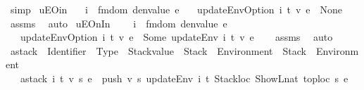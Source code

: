 \begin{isabellebody}
\ simp\isanewline
{}\isamarkupfalse%
%
\endisatagproof
{\isafoldproof}%
%
\isadelimproof
\isanewline
%
\endisadelimproof
\isanewline
{}\isamarkupfalse%
\ uEO{\isacharunderscore}{\kern0pt}in{\isacharcolon}{\kern0pt}\isanewline
\ \ \ {\isachardoublequoteopen}i\ {\isacharbar}{\kern0pt}{\isasymin}{\isacharbar}{\kern0pt}\ fmdom\ {\isacharparenleft}{\kern0pt}denvalue\ e{\isacharparenright}{\kern0pt}{\isachardoublequoteclose}\isanewline
\ \ \ {\isachardoublequoteopen}updateEnvOption\ i\ t\ v\ e\ {\isacharequal}{\kern0pt}\ None{\isachardoublequoteclose}\isanewline
%
\isadelimproof
\ \ %
\endisadelimproof
%
\isatagproof
{}\isamarkupfalse%
\ assms\ \isamarkupfalse%
\ auto%
\endisatagproof
{\isafoldproof}%
%
\isadelimproof
\isanewline
%
\endisadelimproof
\isanewline
{}\isamarkupfalse%
\ uEO{\isacharunderscore}{\kern0pt}n{\isacharunderscore}{\kern0pt}In{\isacharcolon}{\kern0pt}\isanewline
\ \ \ {\isachardoublequoteopen}{\isasymnot}\ i\ {\isacharbar}{\kern0pt}{\isasymin}{\isacharbar}{\kern0pt}\ fmdom\ {\isacharparenleft}{\kern0pt}denvalue\ e{\isacharparenright}{\kern0pt}{\isachardoublequoteclose}\isanewline
\ \ \ {\isachardoublequoteopen}updateEnvOption\ i\ t\ v\ e\ {\isacharequal}{\kern0pt}\ Some\ {\isacharparenleft}{\kern0pt}updateEnv\ i\ t\ v\ e{\isacharparenright}{\kern0pt}{\isachardoublequoteclose}\isanewline
%
\isadelimproof
\ \ %
\endisadelimproof
%
\isatagproof
{}\isamarkupfalse%
\ assms\ \isamarkupfalse%
\ auto%
\endisatagproof
{\isafoldproof}%
%
\isadelimproof
\isanewline
%
\endisadelimproof
\isanewline
{}\isamarkupfalse%
\ astack\ {\isacharcolon}{\kern0pt}{\isacharcolon}{\kern0pt}\ {\isachardoublequoteopen}Identifier\ {\isasymRightarrow}\ Type\ {\isasymRightarrow}\ Stackvalue\ {\isasymRightarrow}\ Stack\ {\isacharasterisk}{\kern0pt}\ Environment\ {\isasymRightarrow}\ Stack\ {\isacharasterisk}{\kern0pt}\ Environment{\isachardoublequoteclose}\isanewline
\ \ \ {\isachardoublequoteopen}astack\ i\ t\ v\ {\isacharparenleft}{\kern0pt}s{\isacharcomma}{\kern0pt}\ e{\isacharparenright}{\kern0pt}\ {\isacharequal}{\kern0pt}\ {\isacharparenleft}{\kern0pt}push\ v\ s{\isacharcomma}{\kern0pt}\ {\isacharparenleft}{\kern0pt}updateEnv\ i\ t\ {\isacharparenleft}{\kern0pt}Stackloc\ {\isacharparenleft}{\kern0pt}ShowL\isactrlsub n\isactrlsub a\isactrlsub t\ {\isacharparenleft}{\kern0pt}toploc\ s{\isacharparenright}{\kern0pt}{\isacharparenright}{\kern0pt}{\isacharparenright}{\kern0pt}\ e{\isacharparenright}{\kern0pt}{\isacharparenright}{\kern0pt}{\isachardoublequoteclose}%

\end{isabellebody}
